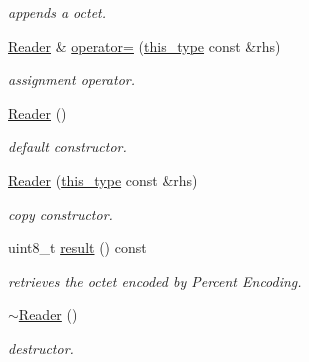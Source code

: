 \begin{DoxyCompactItemize}
\begin{DoxyCompactList}\small\item\em appends a octet. \end{DoxyCompactList}\item 
\hypertarget{classhryky_1_1uri_1_1pct_1_1_reader_ac7e475d63190e18091d21e2ec93c1668}{\hyperlink{classhryky_1_1uri_1_1pct_1_1_reader}{Reader} \& \hyperlink{classhryky_1_1uri_1_1pct_1_1_reader_ac7e475d63190e18091d21e2ec93c1668}{operator=} (\hyperlink{classhryky_1_1uri_1_1pct_1_1_reader_a3b7a7d66f38f342ae28d4200727cdff1}{this\-\_\-type} const \&rhs)}\label{classhryky_1_1uri_1_1pct_1_1_reader_ac7e475d63190e18091d21e2ec93c1668}

\begin{DoxyCompactList}\small\item\em assignment operator. \end{DoxyCompactList}\item 
\hypertarget{classhryky_1_1uri_1_1pct_1_1_reader_ac12bed901ef1b287541e0f85e53845dc}{\hyperlink{classhryky_1_1uri_1_1pct_1_1_reader_ac12bed901ef1b287541e0f85e53845dc}{Reader} ()}\label{classhryky_1_1uri_1_1pct_1_1_reader_ac12bed901ef1b287541e0f85e53845dc}

\begin{DoxyCompactList}\small\item\em default constructor. \end{DoxyCompactList}\item 
\hypertarget{classhryky_1_1uri_1_1pct_1_1_reader_aca8cef8a63ab8a6abadb9f329d97590e}{\hyperlink{classhryky_1_1uri_1_1pct_1_1_reader_aca8cef8a63ab8a6abadb9f329d97590e}{Reader} (\hyperlink{classhryky_1_1uri_1_1pct_1_1_reader_a3b7a7d66f38f342ae28d4200727cdff1}{this\-\_\-type} const \&rhs)}\label{classhryky_1_1uri_1_1pct_1_1_reader_aca8cef8a63ab8a6abadb9f329d97590e}

\begin{DoxyCompactList}\small\item\em copy constructor. \end{DoxyCompactList}\item 
\hypertarget{classhryky_1_1uri_1_1pct_1_1_reader_abf976cbd6ada287214154dea185e553d}{uint8\-\_\-t \hyperlink{classhryky_1_1uri_1_1pct_1_1_reader_abf976cbd6ada287214154dea185e553d}{result} () const }\label{classhryky_1_1uri_1_1pct_1_1_reader_abf976cbd6ada287214154dea185e553d}

\begin{DoxyCompactList}\small\item\em retrieves the octet encoded by Percent Encoding. \end{DoxyCompactList}\item 
\hypertarget{classhryky_1_1uri_1_1pct_1_1_reader_ab591475746d91cefe126d1880f4dd4e1}{\hyperlink{classhryky_1_1uri_1_1pct_1_1_reader_ab591475746d91cefe126d1880f4dd4e1}{$\sim$\-Reader} ()}\label{classhryky_1_1uri_1_1pct_1_1_reader_ab591475746d91cefe126d1880f4dd4e1}

\begin{DoxyCompactList}\small\item\em destructor. \end{DoxyCompactList}\end{DoxyCompactItemize}
